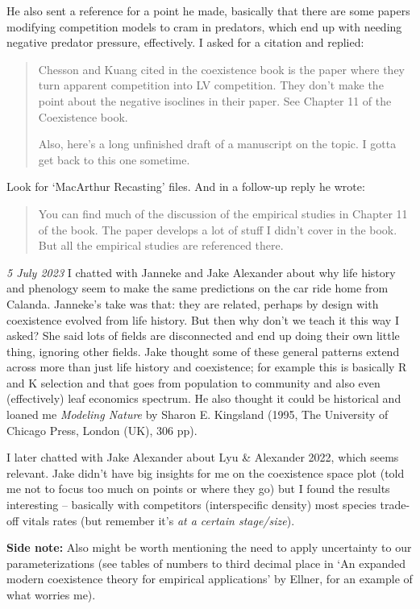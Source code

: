 \documentclass[11pt]{article}
\begin{document}
He also sent a reference for a point he made, basically that there are some papers modifying competition models to cram in predators, which end up with needing negative predator pressure, effectively. I asked for a citation and replied:  

\begin{quote}
Chesson and Kuang cited in the coexistence book is the paper where they turn apparent competition into LV competition.  They don't make the point about the negative isoclines in their paper.  See Chapter 11 of the Coexistence book.

Also, here's a long unfinished draft of a manuscript on the topic.  I gotta get back to this one sometime.
\end{quote}

Look for `MacArthur Recasting' files. And in a follow-up reply he wrote:

\begin{quote}
You can find much of the discussion of the empirical studies in Chapter 11 of the book.  The paper develops a lot of stuff I didn't cover in the book.  But all the empirical studies are referenced there.
\end{quote}

\emph{5 July 2023} I chatted with Janneke and Jake Alexander about why life history and phenology seem to make the same predictions on the car ride home from Calanda. Janneke's take was that: they are related, perhaps by design with coexistence evolved from life history. But then why don't we teach it this way I asked? She said lots of fields are disconnected and end up doing their own little thing, ignoring other fields. Jake thought some of these general patterns extend across more than just life history and coexistence; for example this is basically R and K selection and that goes from population to community and also even (effectively) leaf economics spectrum. He also thought it could be historical and loaned me \emph{Modeling Nature} by Sharon E. Kingsland (1995, The University of Chicago Press, London (UK), 306 pp).

I later chatted with Jake Alexander about Lyu \& Alexander 2022, which seems relevant. Jake didn't have big insights for me on the coexistence space plot (told me not to focus too much on points or where they go) but I found the results interesting -- basically with competitors (interspecific density) most species trade-off vitals rates (but remember it's \emph{at a certain stage/size}). 

{\bf Side note:} Also might be worth mentioning the need to apply uncertainty to our parameterizations (see tables of numbers to third decimal place in `An expanded modern coexistence theory for empirical applications' by Ellner, for an example of what worries me). 
\end{document}
